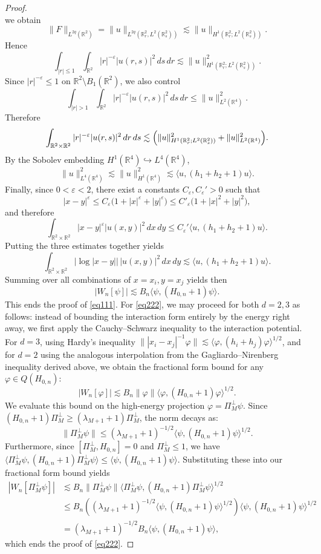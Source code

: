\documentclass[11pt]{amsart}
\newcommand{\1}{\mathbbm{1}}
\newcommand{\R}{\mathbb{R}}
\renewcommand{\phi}{\varphi}
\theoremstyle{plain}
\theoremstyle{definition}
\theoremstyle{remark}
\numberwithin{equation}{section}
\begin{document}
\begin{proof}
\[\]
we obtain
\[
\|F\|_{L^{2q}(\R^2)}=\|u\|_{L^{2q}(\mathbb{R}_r^2,L^2(\mathbb{R}_s^2))}
\lesssim\|u\|_{H^1(\R^2_r;L^2(\R^2_s))}.
\]
Hence
\[
\int_{|r|\le1}\int_{\R^2}|r|^{-\varepsilon}|u(r,s)|^2\,ds\,dr
\lesssim
\|u\|_{H^1(\R^2_r;L^2(\R^2_s))}^2.
\]
Since \(|r|^{-\varepsilon}\le1\) on \(\R^2\setminus B_1(\mathbb{R}^2)\), we also control
\[
\int_{|r|>1}\int_{\R^2}|r|^{-\varepsilon}|u(r,s)|^2\,ds\,dr
\le
\|u\|_{L^2(\R^4)}^2.
\]
Therefore
\[
\int_{\R^2\times\R^2}|r|^{-\varepsilon}|u(r,s)|^2\,dr\,ds
\lesssim
\Bigl(\|u\|_{H^1(\R^2_r;L^2(\R^2_s))}^2+\|u\|_{L^2(\R^4)}^2\Bigr).
\]
By the Sobolev embedding \(H^1(\R^4)\hookrightarrow L^4(\R^4)\),
\[
\|u\|_{L^4(\R^4)}^2
\lesssim\|u\|_{H^1(\R^4)}^2
\lesssim
\langle u,(h_1+h_2+1)u\rangle.
\]
Finally, since \(0<\varepsilon<2\), there exist a constants $C_\varepsilon,C_\varepsilon'>0$ such that
\[
|x-y|^\varepsilon\le C_{\varepsilon}\bigl(1+|x|^\varepsilon+|y|^\varepsilon\bigr)
\le C'_{\varepsilon}\bigl(1+|x|^2+|y|^2\bigr),
\]
and therefore
\[
\int_{\R^2\times\R^2}|x-y|^\varepsilon |u(x,y)|^2\,dx\,dy
\le
C_\varepsilon'\langle u,(h_1+h_2+1)u\rangle.
\]
Putting the three estimates together yields
\[
\int_{\R^2\times\R^2}|\log|x-y||\,|u(x,y)|^2\,dx\,dy
\lesssim
\langle u,(h_1+h_2+1)u\rangle.
\]
Summing over all combinations of $x=x_i,y=x_j$ yields then 
\[
|W_n[\psi]|\lesssim B_n\langle\psi,(H_{0,n}+1)\psi\rangle.
\]
This ends the proof of \eqref{eq111}. For \eqref{eq222}, we may proceed for both $d=2,3$ as follows:
instead of bounding the interaction form entirely by the energy right away, we first apply the Cauchy--Schwarz inequality to the interaction potential. For $d=3$, using Hardy's inequality $\| |x_i-x_j|^{-1}\phi \| \lesssim \langle \phi, (h_i+h_j)\phi \rangle^{1/2}$, and for $d=2$ using the analogous interpolation from the Gagliardo--Nirenberg inequality derived above, we obtain the fractional form bound for any $\phi \in Q(H_{0,n})$:
\[
|W_n[\phi]| \lesssim B_n \|\phi\| \langle \phi, (H_{0,n}+1)\phi \rangle^{1/2}.
\]
We evaluate this bound on the high-energy projection $\phi = \Pi_M^\perp\psi$. Since $(H_{0,n}+1)\Pi_M^\perp\ge(\lambda_{M+1}+1)\Pi_M^\perp$, the norm decays as:
\[ 
\|\Pi_M^\perp\psi\| \le (\lambda_{M+1}+1)^{-1/2}\langle\psi,(H_{0,n}+1)\psi\rangle^{1/2}.
\]
Furthermore, since $[\Pi_M^\perp,H_{0,n}]=0$ and $\Pi_M^\perp \le 1$, we have $\langle \Pi_M^\perp\psi, (H_{0,n}+1)\Pi_M^\perp\psi\rangle \le \langle \psi, (H_{0,n}+1)\psi\rangle$. Substituting these into our fractional form bound yields
\begin{align}
|W_n[\Pi_M^\perp\psi]| &\lesssim B_n \|\Pi_M^\perp\psi\| \langle \Pi_M^\perp\psi, (H_{0,n}+1)\Pi_M^\perp\psi \rangle^{1/2}\nonumber\\
&\le B_n \left( (\lambda_{M+1}+1)^{-1/2} \langle \psi, (H_{0,n}+1)\psi \rangle^{1/2} \right) \langle \psi, (H_{0,n}+1)\psi \rangle^{1/2}\nonumber\\
&= (\lambda_{M+1}+1)^{-1/2}B_n\langle \psi,(H_{0,n}+1)\psi\rangle,\label{eq2222}
\end{align}
which ends the proof of \eqref{eq222}.



\end{proof}
\end{document}
